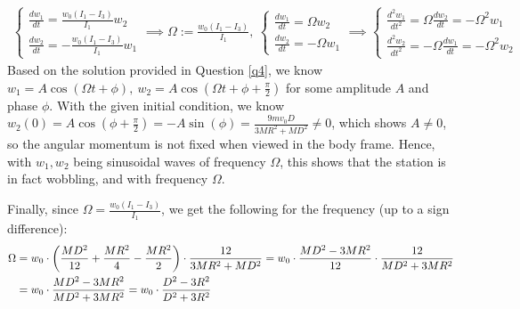 \documentclass{article}
\DeclarePairedDelimiter{\paran}{(}{)}%
\begin{document}
\begin{align}
    \begin{cases}
        \frac{dw_1}{dt}=\frac{w_0(I_1-I_3)}{I_1}w_2\\
        \frac{dw_2}{dt}=-\frac{w_0(I_1-I_3)}{I_1}w_1
    \end{cases} \implies \Omega := \frac{w_0(I_1-I_3)}{I_1},\ \begin{cases}
        \frac{dw_1}{dt}=\Omega w_2\\
        \frac{dw_2}{dt}=-\Omega w_1
    \end{cases}\implies \begin{cases}
        \frac{d^2w_1}{dt^2}=\Omega \frac{dw_2}{dt} = -\Omega^2 w_1\\
        \frac{d^2w_2}{dt^2}=-\Omega \frac{dw_1}{dt} = -\Omega^2 w_2
    \end{cases}
\end{align}
Based on the solution provided in Question \ref{q4}, we know $w_1 = A\cos(\Omega t+\phi),\ w_2=A\cos(\Omega t+\phi+\frac{\pi}{2})$ for some amplitude $A$ and phase $\phi$. With the given initial condition, we know $w_2(0)=A\cos(\phi+\frac{\pi}{2}) = -A\sin(\phi) =\frac{9mv_0D}{3MR^2+MD^2}\neq 0$, which shows $A\neq 0$, so the angular momentum is not fixed when viewed in the body frame. Hence, with $w_1,w_2$ being sinusoidal waves of frequency $\Omega$, this shows that the station is in fact wobbling, and with frequency $\Omega$.

Finally, since $\Omega = \frac{w_0(I_1-I_3)}{I_1}$, we get the following for the frequency (up to a sign difference):
\begin{align}
    \Omega &= w_0\cdot \paran*{\frac{MD^2}{12}+\frac{MR^2}{4}-\frac{MR^2}{2}}\cdot\frac{12}{3MR^2+MD^2} = w_0\cdot\frac{MD^2-3MR^2}{12}\cdot \frac{12}{MD^2+3MR^2} \\
    &= w_0\cdot\frac{MD^2-3MR^2}{MD^2+3MR^2} = w_0\cdot\frac{D^2-3R^2}{D^2+3R^2}
\end{align}

\end{document}
